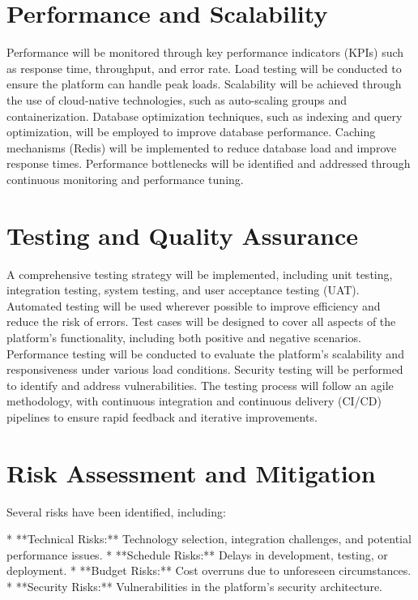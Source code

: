 \documentclass[11pt,a4paper,oneside]{article}
\begin{document}
\section{Performance and Scalability}

Performance will be monitored through key performance indicators (KPIs) such as response time, throughput, and error rate.  Load testing will be conducted to ensure the platform can handle peak loads.  Scalability will be achieved through the use of cloud-native technologies, such as auto-scaling groups and containerization.  Database optimization techniques, such as indexing and query optimization, will be employed to improve database performance.  Caching mechanisms (Redis) will be implemented to reduce database load and improve response times.  Performance bottlenecks will be identified and addressed through continuous monitoring and performance tuning.

\section{Testing and Quality Assurance}

A comprehensive testing strategy will be implemented, including unit testing, integration testing, system testing, and user acceptance testing (UAT).  Automated testing will be used wherever possible to improve efficiency and reduce the risk of errors.  Test cases will be designed to cover all aspects of the platform's functionality, including both positive and negative scenarios.  Performance testing will be conducted to evaluate the platform's scalability and responsiveness under various load conditions.  Security testing will be performed to identify and address vulnerabilities.  The testing process will follow an agile methodology, with continuous integration and continuous delivery (CI/CD) pipelines to ensure rapid feedback and iterative improvements.

\section{Risk Assessment and Mitigation}

Several risks have been identified, including:

* **Technical Risks:**  Technology selection, integration challenges, and potential performance issues.
* **Schedule Risks:**  Delays in development, testing, or deployment.
* **Budget Risks:**  Cost overruns due to unforeseen circumstances.
* **Security Risks:**  Vulnerabilities in the platform's security architecture.
\end{document}

